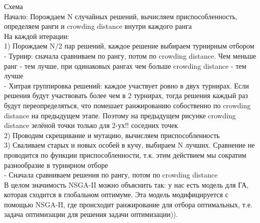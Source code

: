 Схема\\
Начало: Порождаем N случайных решений, вычисляем приспособленность,
определяем ранги и crowding distance внутри каждого ранга\\
На каждой итерации:\\
1) Порождаем N/2 пар решений, каждое решение выбираем турнирным отбором\\
- Турнир: сначала сравниваем по рангу, потом по crowding distance. Чем меньше ранг - тем лучше, при одинаковых рангах чем больше crowding distance - тем лучше\\
- Хитрая группировка решений: каждое участвует ровно в двух турнирах. Если решения будут участвовать более чем в 2 турнирах, тогда решения каждый раз будут переопределяться, что помешает ранжированию собоственно по crowding distance на предыдущем этапе. Поэтому на предыдущем рисунке crowding distance зелёной точки только для 2-ух!! соседних точек\\
2) Проводим скрещивание и мутацию, вычисляем приспособленность\\
3) Сваливаем старых и новых особей в кучу, выбираем N лучших. Сравнение не проводится по функции приспособленности, т.к. этим действием мы сократим разнообразие в турнирном отборе\\
- Сначала сравниваем решения по рангу, потом по crowding distance\\

 В целом значимость NSGA-II можно объяснить так: у нас есть модель для ГА, которая сходится в глобальном оптимуме. Эта модель модифицируется с помощью NSGA-II, где происходит ранжирование для отбора оптимальных, т.е. задача оптимизации для решения задачи оптимизации)).

